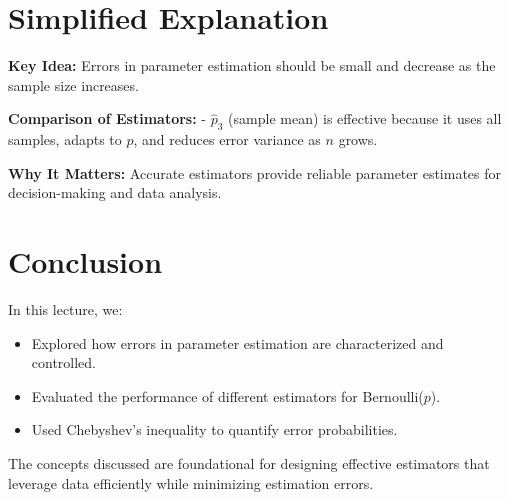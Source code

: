 \documentclass{article}
\begin{document}
\section*{Simplified Explanation}

\textbf{Key Idea:}
Errors in parameter estimation should be small and decrease as the sample size increases.

\textbf{Comparison of Estimators:}
- $\hat{p}_3$ (sample mean) is effective because it uses all samples, adapts to $p$, and reduces error variance as $n$ grows.

\textbf{Why It Matters:}
Accurate estimators provide reliable parameter estimates for decision-making and data analysis.

\section*{Conclusion}

In this lecture, we:
\begin{itemize}
  \item Explored how errors in parameter estimation are characterized and controlled.
  \item Evaluated the performance of different estimators for Bernoulli($p$).
  \item Used Chebyshev's inequality to quantify error probabilities.
\end{itemize}

The concepts discussed are foundational for designing effective estimators that leverage data efficiently while minimizing estimation errors.
\end{document}
